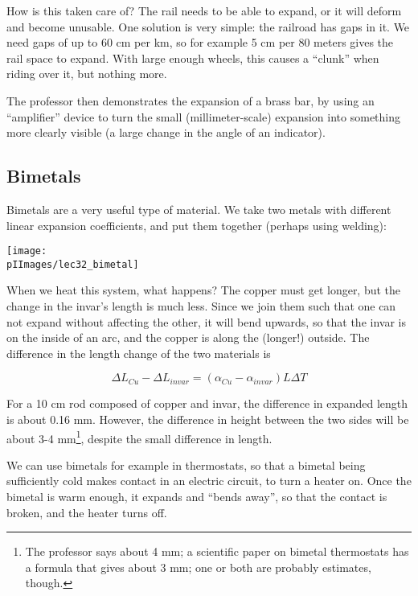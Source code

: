 How is this taken care of? The rail needs to be able to expand, or it will deform and become unusable. One solution is very simple: the railroad has gaps in it. We need gaps of up to 60 cm per km, so for example 5 cm per 80 meters gives the rail space to expand. With large enough wheels, this causes a ``clunk'' when riding over it, but nothing more.

The professor then demonstrates the expansion of a brass bar, by using an ``amplifier'' device to turn the small (millimeter-scale) expansion into something more clearly visible (a large change in the angle of an indicator).

\subsection{Bimetals}

Bimetals are a very useful type of material. We take two metals with different linear expansion coefficients, and put them together (perhaps using welding):

\begin{center}
\texttt{[image: \\pIImages/lec32\_bimetal]}
\end{center}

When we heat this system, what happens? The copper must get longer, but the change in the invar's length is much less. Since we join them such that one can not expand without affecting the other, it will bend upwards, so that the invar is on the inside of an arc, and the copper is along the (longer!) outside. The difference in the length change of the two materials is

\begin{equation}
\Delta L_{Cu} - \Delta L_{invar} = (\alpha_{Cu} - \alpha_{invar}) L \Delta T
\end{equation}

For a 10 cm rod composed of copper and invar, the difference in expanded length is about 0.16 mm. However, the difference in height between the two sides will be about 3-4 mm\footnote{The professor says about 4 mm; a scientific paper on bimetal thermostats has a formula that gives about 3 mm; one or both are probably estimates, though.}, despite the small difference in length.

We can use bimetals for example in thermostats, so that a bimetal being sufficiently cold makes contact in an electric circuit, to turn a heater on. Once the bimetal is warm enough, it expands and ``bends away'', so that the contact is broken, and the heater turns off.

